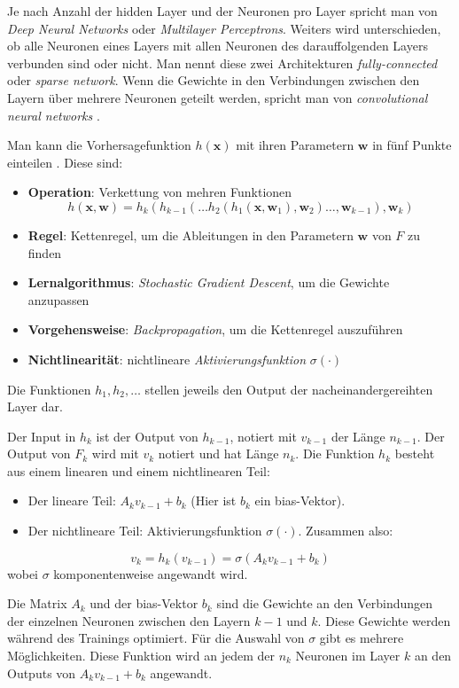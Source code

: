 Je nach Anzahl der hidden Layer und der Neuronen pro Layer spricht man von \textit{Deep Neural Networks} oder \textit{Multilayer Perceptrons}. Weiters wird unterschieden, ob
alle Neuronen eines Layers mit allen Neuronen des darauffolgenden Layers verbunden sind oder nicht. Man nennt diese zwei Architekturen \textit{fully-connected} oder \textit{sparse network}.
Wenn die Gewichte in den Verbindungen zwischen den Layern \"uber mehrere Neuronen geteilt werden, spricht man von \textit{convolutional neural networks} \cite[Kapitel 7.2]{strang}.

Man kann die Vorhersagefunktion $h(\mathbf{x})$ mit ihren Parametern $\mathbf{w}$ in f\"unf Punkte einteilen \cite[Kapitel 7.1]{strang}.
Diese sind:
\begin{itemize}
	\item \textbf{Operation}: Verkettung von mehren Funktionen
	      $$h(\mathbf{x}, \mathbf{w}) = h_k(h_{k-1}(\dots h_2(h_1(\mathbf{x}, \mathbf{w}_1), \mathbf{w}_2)\dots,\mathbf{w}_{k-1}),\mathbf{w}_k)$$
	\item \textbf{Regel}: Kettenregel, um die Ableitungen in den Parametern $\mathbf{w}$ von $F$ zu finden
	\item \textbf{Lernalgorithmus}: \textit{Stochastic Gradient Descent}, um die Gewichte anzupassen
	\item \textbf{Vorgehensweise}: \textit{Backpropagation}, um die Kettenregel auszuf\"uhren
	\item \textbf{Nichtlinearit\"at}: nichtlineare \textit{Aktivierungsfunktion} $\sigma(\cdot)$
\end{itemize}

Die Funktionen $h_1, h_2, \dots$ stellen jeweils den Output der nacheinandergereihten Layer dar.

Der Input in $h_k$ ist der Output von $h_{k-1}$, notiert mit $v_{k-1}$ der L\"ange $n_{k-1}$. Der Output von $F_k$ wird mit $v_k$ notiert und hat L\"ange $n_k$.
Die Funktion $h_k$ besteht aus einem linearen und einem nichtlinearen Teil:

\begin{itemize}
	\item Der lineare Teil: $A_k v_{k-1} + b_k$ (Hier ist $b_k$ ein bias-Vektor).
	\item Der nichtlineare Teil: Aktivierungsfunktion $\sigma(\cdot)$. Zusammen also:
\end{itemize}
$$ v_k = h_k(v_{k-1}) = \sigma(A_k v_{k-1} + b_k) $$
wobei $\sigma$ komponentenweise angewandt wird.

Die Matrix $A_k$ und der bias-Vektor $b_k$ sind die Gewichte an den Verbindungen der einzelnen Neuronen zwischen den Layern $k-1$ und $k$.
Diese Gewichte werden w\"ahrend des Trainings optimiert. F\"ur die Auswahl von $\sigma$ gibt es mehrere M\"oglichkeiten. Diese Funktion wird an jedem der
$n_k$ Neuronen im Layer $k$ an den Outputs von $A_k v_{k-1} + b_k$ angewandt.

